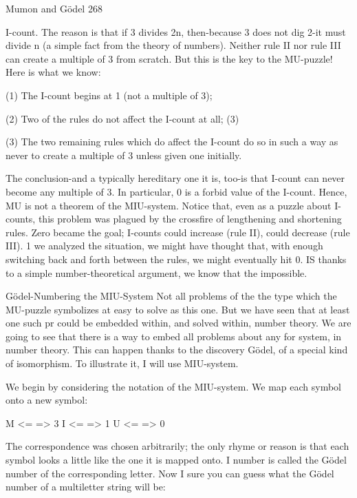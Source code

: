 Mumon and Gödel                                                                          268

I-count. The reason is that if 3 divides 2n, then-because 3 does not dig 2-it must divide n
(a simple fact from the theory of numbers). Neither rule II nor rule III can create a
multiple of 3 from scratch.
       But this is the key to the MU-puzzle! Here is what we know:

   (1) The I-count begins at 1 (not a multiple of 3);

   (2) Two of the rules do not affect the I-count at all; (3)

   (3) The two remaining rules which do affect the I-count do so in such a way as never
   to create a multiple of 3 unless given one initially.

 The conclusion-and a typically hereditary one it is, too-is that I-count can never become
  any multiple of 3. In particular, 0 is a forbid value of the I-count. Hence, MU is not a
                               theorem of the MIU-system.
        Notice that, even as a puzzle about I-counts, this problem was plagued by the
crossfire of lengthening and shortening rules. Zero became the goal; I-counts could
increase (rule II), could decrease (rule III). 1 we analyzed the situation, we might have
thought that, with enough switching back and forth between the rules, we might
eventually hit 0. IS thanks to a simple number-theoretical argument, we know that the
impossible.

                       Gödel-Numbering the MIU-System
Not all problems of the the type which the MU-puzzle symbolizes at easy to solve as this
one. But we have seen that at least one such pr could be embedded within, and solved
within, number theory. We are going to see that there is a way to embed all problems
about any for system, in number theory. This can happen thanks to the discovery Gödel,
of a special kind of isomorphism. To illustrate it, I will use MIU-system.

We begin by considering the notation of the MIU-system. We map each symbol onto a
new symbol:

                                  M <= => 3
                                   I <= => 1
                                  U <= => 0

The correspondence was chosen arbitrarily; the only rhyme or reason is that each symbol
looks a little like the one it is mapped onto. I number is called the Gödel number of the
corresponding letter. Now I sure you can guess what the Gödel number of a multiletter
string will be:

